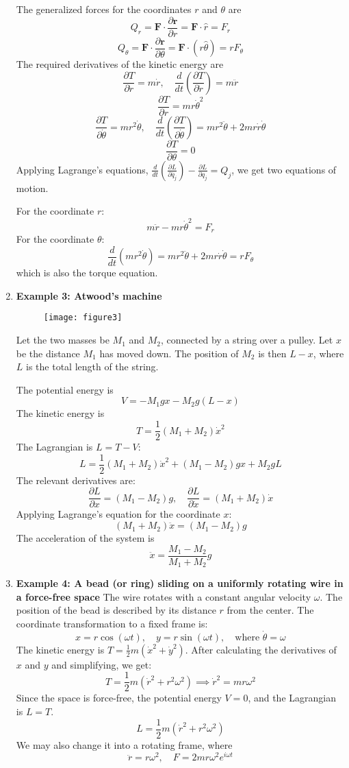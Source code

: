 \documentclass[12pt,a4paper]{article}
\theoremstyle{definition}
\theoremstyle{remark}
\renewcommand{\vec}[1]{\mathbf{#1}}
\begin{document}
\begin{enumerate}
		The generalized forces for the coordinates $r$ and $\theta$ are
		$$ Q_r = \vec{F} \cdot \frac{\partial\vec{r}}{\partial r} = \vec{F} \cdot \hat{r} = F_r $$
		$$ Q_\theta = \vec{F} \cdot \frac{\partial\vec{r}}{\partial \theta} = \vec{F} \cdot (r\hat{\theta}) = r F_\theta $$
		The required derivatives of the kinetic energy are
		$$ \frac{\partial T}{\partial \dot{r}} = m\dot{r}, \quad \frac{d}{dt}\left(\frac{\partial T}{\partial \dot{r}}\right) = m\ddot{r} $$
		$$ \frac{\partial T}{\partial r} = mr\dot{\theta}^2 $$
		$$ \frac{\partial T}{\partial \dot{\theta}} = mr^2\dot{\theta}, \quad \frac{d}{dt}\left(\frac{\partial T}{\partial \dot{\theta}}\right) = mr^2\ddot{\theta} + 2mr\dot{r}\dot{\theta} $$
		$$ \frac{\partial T}{\partial \theta} = 0 $$
		Applying Lagrange's equations, $\frac{d}{dt}(\frac{\partial L}{\partial \dot{q_j}}) - \frac{\partial L}{\partial q_j} = Q_j$, we get two equations of motion.
		
		For the coordinate $r$:
		$$ m\ddot{r} - mr\dot{\theta}^2 = F_r $$
		For the coordinate $\theta$:
		$$ \frac{d}{dt}(mr^2\dot{\theta}) = mr^2\ddot{\theta} + 2mr\dot{r}\dot{\theta} = rF_\theta $$
		which is also the torque equation.
		
		
		\item \textbf{Example 3: Atwood's machine}
		\begin{figure}[h]
			\centering
			\texttt{[image: figure3]}
			\caption{}
			\label{fig:figure3page27}
		\end{figure}
		Let the two masses be $M_1$ and $M_2$, connected by a string over a pulley. Let $x$ be the distance $M_1$ has moved down. The position of $M_2$ is then $L-x$, where $L$ is the total length of the string.
		
		The potential energy is
		$$ V = -M_1 g x - M_2 g (L-x) $$
		The kinetic energy is
		$$ T = \frac{1}{2}(M_1+M_2)\dot{x}^2 $$
		The Lagrangian is $L = T-V$:
		$$ L = \frac{1}{2}(M_1+M_2)\dot{x}^2 + (M_1-M_2)gx + M_2gL $$
		The relevant derivatives are:
		$$ \frac{\partial L}{\partial x} = (M_1-M_2)g, \quad \frac{\partial L}{\partial \dot{x}} = (M_1+M_2)\dot{x} $$
		Applying Lagrange's equation for the coordinate $x$:
		$$ (M_1+M_2)\ddot{x} = (M_1-M_2)g $$
		The acceleration of the system is
		$$ \ddot{x} = \frac{M_1-M_2}{M_1+M_2}g $$
		
		\item \textbf{Example 4: A bead (or ring) sliding on a uniformly rotating wire in a force-free space}
		The wire rotates with a constant angular velocity $\omega$. The position of the bead is described by its distance $r$ from the center.
		The coordinate transformation to a fixed frame is:
		$$ x = r\cos(\omega t), \quad y = r\sin(\omega t), \quad \text{where } \dot{\theta} = \omega $$
		The kinetic energy is $T = \frac{1}{2}m(\dot{x}^2+\dot{y}^2)$. After calculating the derivatives of $x$ and $y$ and simplifying, we get:
		$$ T = \frac{1}{2}m(\dot{r}^2 + r^2\omega^2) \implies \dot{r}^2 = mr\omega^2 $$
		Since the space is force-free, the potential energy $V=0$, and the Lagrangian is $L=T$.
		$$ L = \frac{1}{2}m(\dot{r}^2+r^2\omega^2) $$
		We may also change it into a rotating frame, where
		$$ \ddot{r} = r\omega^2, \quad F = 2mr\omega^2 e^{i\omega t} $$
		
		
	\end{enumerate}
	
\end{document}
